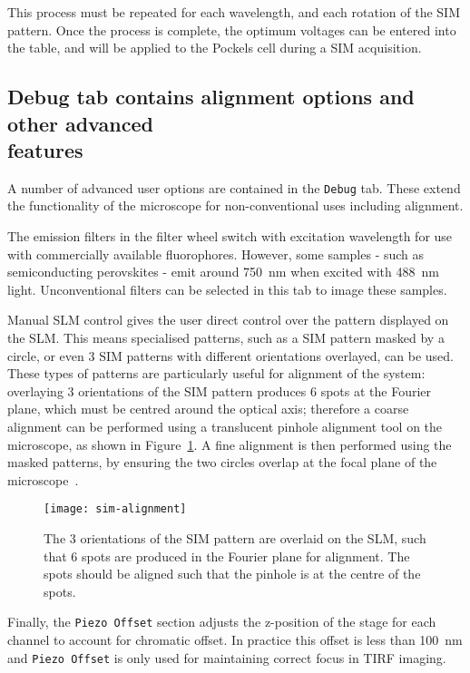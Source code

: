 This process must be repeated for each wavelength, and each rotation of the SIM pattern.
Once the process is complete, the optimum voltages can be entered into the table, and will be applied to the Pockels cell during a SIM acquisition.


\subsection[Debug tab contains alignment options and other advanced features]{Debug tab contains alignment options and other advanced\\ features}
A number of advanced user options are contained in the \texttt{Debug} tab.
These extend the functionality of the microscope for non-conventional uses including alignment.

The emission filters in the filter wheel switch with excitation wavelength for use with commercially available fluorophores.
However, some samples - such as semiconducting perovskites - emit around \SI{750}{\nano\metre} when excited with \SI{488}{\nano\metre} light.
Unconventional filters can be selected in this tab to image these samples.

Manual SLM control gives the user direct control over the pattern displayed on the SLM.
This means specialised patterns, such as a SIM pattern masked by a circle, or even 3 SIM patterns with different orientations overlayed, can be used.
These types of patterns are particularly useful for alignment of the system: overlaying 3 orientations of the SIM pattern produces 6 spots at the Fourier plane, which must be centred around the optical axis; therefore a coarse alignment can be performed using a translucent pinhole alignment tool on the microscope, as shown in Figure~\ref{fig:pinhole-alignment}.
A fine alignment is then performed using the masked patterns, by ensuring the two circles overlap at the focal plane of the microscope~\cite{young2016guide}.

\begin{figure}[htbp!]
\centering
\texttt{[image: sim-alignment]}
\caption[LAG SIM: Displaying specially designed patterns on the SLM assists with alignment of LAG SIM]{The 3 orientations of the SIM pattern are overlaid on the SLM, such that 6 spots are produced in the Fourier plane for alignment. The spots should be aligned such that the pinhole is at the centre of the spots.}
\label{fig:pinhole-alignment}
\end{figure}

Finally, the \texttt{Piezo Offset} section adjusts the z-position of the stage for each channel to account for chromatic offset.
In practice this offset is less than \SI{100}{\nano\meter} and \texttt{Piezo Offset} is only used for maintaining correct focus in TIRF imaging.

